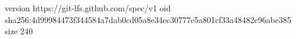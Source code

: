 version https://git-lfs.github.com/spec/v1
oid sha256:4d99984473f344584a7dab0cd05a8e34ec30777e5a801cf33a48482c96abe385
size 240
